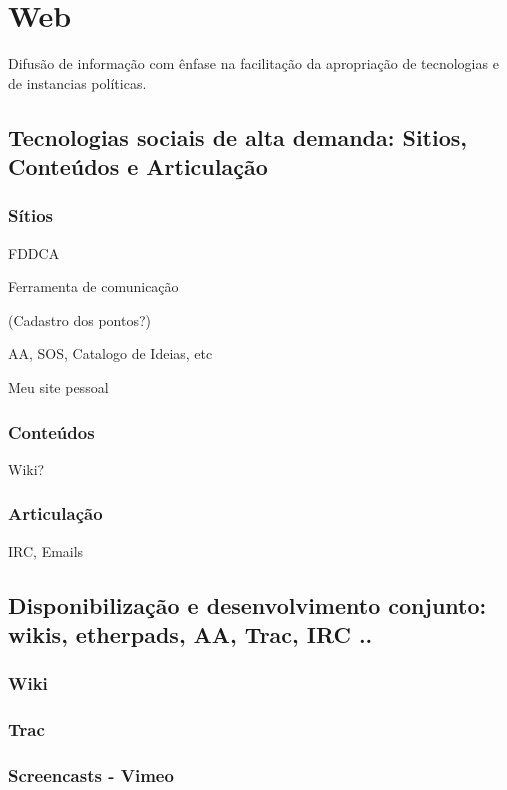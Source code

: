 \section{Web}

  Difusão de informação com ênfase na facilitação
  da apropriação de tecnologias e de instancias políticas.

   \subsection{Tecnologias sociais de alta demanda: Sitios, Conteúdos e Articulação}

      \subsubsection{Sítios}

      FDDCA

      Ferramenta de comunicação

      (Cadastro dos pontos?)

      AA, SOS, Catalogo de Ideias, etc

      Meu site pessoal


      \subsubsection{Conteúdos}

      Wiki?

      \subsubsection{Articulação}

      IRC, Emails

\subsection{Disponibilização e desenvolvimento conjunto: wikis, etherpads, AA, Trac, IRC ..}

\subsubsection{Wiki}

\subsubsection{Trac}

\subsubsection{Screencasts - Vimeo}

